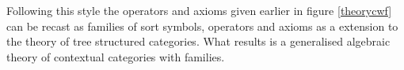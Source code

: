 \note
Following this style the operators and axioms given earlier in figure \ref{theorycwf} can be recast as
families of sort symbols, operators and axioms as a extension to the theory of tree structured categories.
What results is a  generalised algebraic theory of contextual categories with families.




